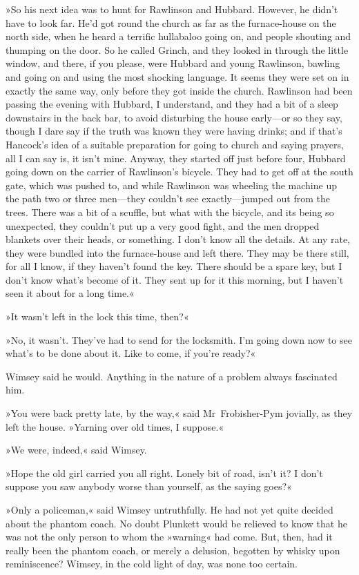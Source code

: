 »So his next idea was to hunt for Rawlinson and Hubbard. However, he didn't have to look far. He'd got round the church as far as the furnace-house on the north side, when he heard a terrific hullabaloo going on, and people shouting and thumping on the door. So he called Grinch, and they looked in through the little window, and there, if you please, were Hubbard and young Rawlinson, bawling and going on and using the most shocking language. It seems they were set on in exactly the same way, only before they got inside the church. Rawlinson had been passing the evening with Hubbard, I understand, and they had a bit of a sleep downstairs in the back bar, to avoid disturbing the house early—or so they say, though I dare say if the truth was known they were having drinks; and if that's Hancock's idea of a suitable preparation for going to church and saying prayers, all I can say is, it isn't mine. Anyway, they started off just before four, Hubbard going down on the carrier of Rawlinson's bicycle. They had to get off at the south gate, which was pushed to, and while Rawlinson was wheeling the machine up the path two or three men—they couldn't see exactly—jumped out from the trees. There was a bit of a scuffle, but what with the bicycle, and its being so unexpected, they couldn't put up a very good fight, and the men dropped blankets over their heads, or something. I don't know all the details. At any rate, they were bundled into the furnace-house and left there. They may be there still, for all I know, if they haven't found the key. There should be a spare key, but I don't know what's become of it. They sent up for it this morning, but I haven't seen it about for a long time.«

»It wasn't left in the lock this time, then?«

»No, it wasn't. They've had to send for the locksmith. I'm going down now to see what's to be done about it. Like to come, if you're ready?«

Wimsey said he would. Anything in the nature of a problem always fascinated him.

»You were back pretty late, by the way,« said Mr~Frobisher-Pym jovially, as they left the house. »Yarning over old times, I suppose.«

»We were, indeed,« said Wimsey.

»Hope the old girl carried you all right. Lonely bit of road, isn't it? I don't suppose you saw anybody worse than yourself, as the saying goes?«

»Only a policeman,« said Wimsey untruthfully. He had not yet quite decided about the phantom coach. No doubt Plunkett would be relieved to know that he was not the only person to whom the »warning« had come. But, then, had it really been the phantom coach, or merely a delusion, begotten by whisky upon reminiscence? Wimsey, in the cold light of day, was none too certain.

